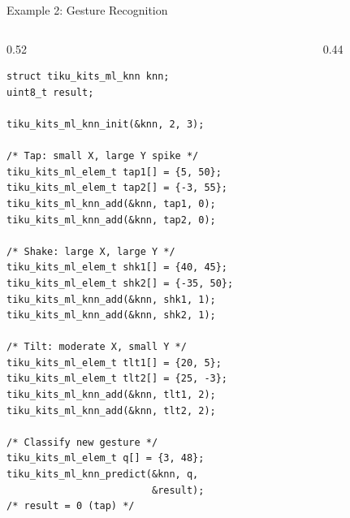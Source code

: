 \documentclass[aspectratio=169, 10pt]{beamer}
\begin{document}
\begin{frame}[fragile]{Example 2: Gesture Recognition}
\begin{columns}[T]
\begin{column}{0.52\textwidth}
\begin{lstlisting}[style=cstyle,
  title={2-D accelerometer: tap/shake/tilt}]
struct tiku_kits_ml_knn knn;
uint8_t result;

tiku_kits_ml_knn_init(&knn, 2, 3);

/* Tap: small X, large Y spike */
tiku_kits_ml_elem_t tap1[] = {5, 50};
tiku_kits_ml_elem_t tap2[] = {-3, 55};
tiku_kits_ml_knn_add(&knn, tap1, 0);
tiku_kits_ml_knn_add(&knn, tap2, 0);

/* Shake: large X, large Y */
tiku_kits_ml_elem_t shk1[] = {40, 45};
tiku_kits_ml_elem_t shk2[] = {-35, 50};
tiku_kits_ml_knn_add(&knn, shk1, 1);
tiku_kits_ml_knn_add(&knn, shk2, 1);

/* Tilt: moderate X, small Y */
tiku_kits_ml_elem_t tlt1[] = {20, 5};
tiku_kits_ml_elem_t tlt2[] = {25, -3};
tiku_kits_ml_knn_add(&knn, tlt1, 2);
tiku_kits_ml_knn_add(&knn, tlt2, 2);

/* Classify new gesture */
tiku_kits_ml_elem_t q[] = {3, 48};
tiku_kits_ml_knn_predict(&knn, q,
                         &result);
/* result = 0 (tap) */
\end{lstlisting}
\end{column}

\begin{column}{0.44\textwidth}
\begin{center}
\end{center}


\end{column}
\end{columns}
\end{frame}
\end{document}
